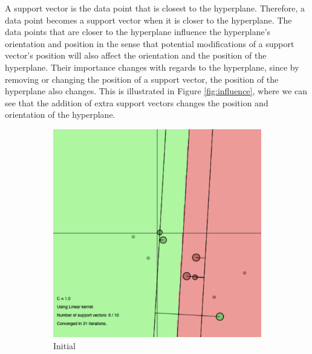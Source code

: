 \documentclass[a4paper, 11pt, one column]{article}
\begin{document}
A support vector is the data point that is closest to the hyperplane. Therefore, a data point becomes a support vector when it is closer to the hyperplane. The data points that are closer to the hyperplane influence the hyperplane's orientation and position in the sense that potential modifications of a support vector's position will also affect the orientation and the position of the hyperplane. Their importance changes with regards to the hyperplane, since by removing or changing the position of a support vector, the position of the hyperplane also changes. This is illustrated in Figure \ref{fig:influence}, where we can see that the addition of extra support vectors changes the position and orientation of the hyperplane. 

\begin{figure}[]
    \centering
    \begin{subfigure}{0.4\linewidth}
        \includegraphics[width=\linewidth]{images/sup_imp_2.png}
        \caption{Initial}
    \end{subfigure}
    \begin{subfigure}{0.4\linewidth}

\end{subfigure}
\end{figure}
\end{document}
